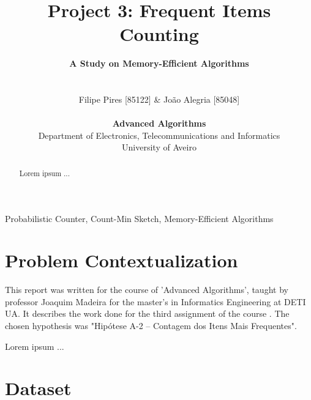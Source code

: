 \documentclass[shortpaper]{revdetua}
\begin{document}
 

\title{
    \LARGE{{\bf Project 3: Frequent Items Counting \/}}
    \vspace{-20pt}
}

\author{
    \Large{{\bf A Study on Memory-Efficient Algorithms\/}}\\\\\\
    Filipe Pires [85122] \& João Alegria [85048]\\
    \\
    {\bf Advanced Algorithms\/}\\
    \normalsize{Department of Electronics, Telecommunications and Informatics}\\
    \normalsize{University of Aveiro}\\
} 

\maketitle


\begin{abstract}
    Lorem ipsum ...
\end{abstract}

\begin{keywords}
    Probabilistic Counter, Count-Min Sketch, Memory-Efficient Algorithms
\end{keywords}


\section{Problem Contextualization}

This report was written for the course of 'Advanced Algorithms', taught by 
professor Joaquim Madeira for the master's in Informatics Engineering at DETI UA.
It describes the work done for the third assignment of the course \cite{trab3}.
The chosen hypothesis was "Hipótese A-2 – Contagem dos Itens Mais Frequentes".

Lorem ipsum ...


\section{Dataset}
\end{document}
